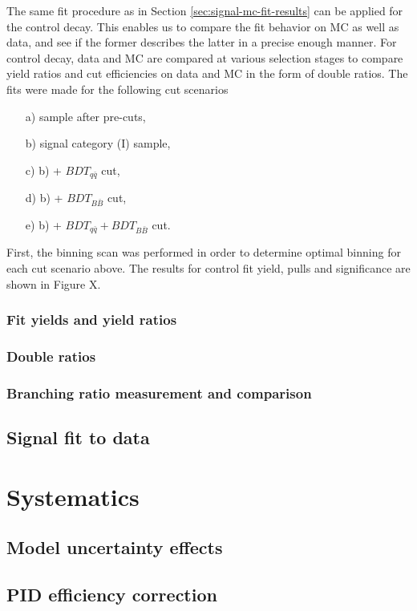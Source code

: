 \documentclass[  headings=standardclasses,
  headings=big,oneside,a4paper,openany,12pt]{scrbook}
\begin{document}
The same fit procedure as in Section \ref{sec:signal-mc-fit-results} can be applied for the control decay. This enables us to compare the fit behavior on MC as well as data, and see if the former describes the latter in a precise enough manner. For control decay, data and MC are compared at various selection stages to compare yield ratios and cut efficiencies on data and MC in the form of double ratios. The fits were made for the following cut scenarios
\begin{itemize}
\item[a)] sample after pre-cuts,
\item[b)] signal category (I) sample,
\item[c)] b) + $BDT_{q\bar q}$ cut,
\item[d)] b) + $BDT_{B\bar B}$ cut,
\item[e)] b) + $BDT_{q\bar q} + BDT_{B\bar B}$ cut.
\end{itemize}

First, the binning scan was performed in order to determine optimal binning for each cut scenario above. The results for control fit yield, pulls and significance are shown in Figure X. 


\subsection{Fit yields and yield ratios}
\subsection{Double ratios}
\subsection{Branching ratio measurement and comparison}

\section{Signal fit to data}

\chapter{Systematics}
\section{Model uncertainty effects}
\section{PID efficiency correction}
\end{document}
